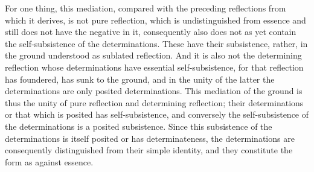 For one thing, this mediation,
compared with the preceding reflections
from which it derives,
is not pure reflection,
which is undistinguished from essence
and still does not have the negative in it,
consequently also does not as yet contain
the self-subsistence of the determinations.
These have their subsistence, rather,
in the ground understood as sublated reflection.
And it is also not the determining reflection
whose determinations have essential self-subsistence,
for that reflection has foundered, has sunk to the ground,
and in the unity of the latter
the determinations are only posited determinations.
This mediation of the ground is thus
the unity of pure reflection and determining reflection;
their determinations or that which is posited has self-subsistence,
and conversely the self-subsistence of
the determinations is a posited subsistence.
Since this subsistence of the determinations is
itself posited or has determinateness,
the determinations are consequently distinguished
from their simple identity,
and they constitute the form as against essence.

